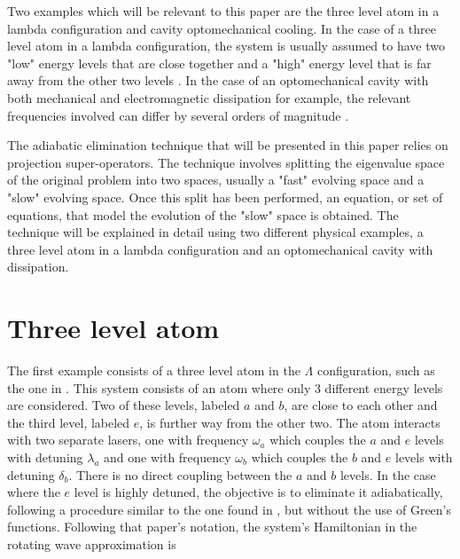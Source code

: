 \documentclass[12pt]{article}
\begin{document}
 Two examples which will be relevant to this paper are the three level atom in a lambda configuration and cavity optomechanical cooling.  In the case of a three level atom in a lambda configuration, the system is usually assumed to have two "low" energy levels that are close together and a "high" energy level that is far away from the other two levels \cite{BrionAdiabatic2006}. In the case of an optomechanical cavity with both mechanical and electromagnetic dissipation for example, the relevant frequencies involved can differ by several orders of magnitude \cite{VezioOMExperiment2020}.

The adiabatic elimination technique that will be presented in this paper relies on projection super-operators. The technique involves splitting the eigenvalue space of the original problem into two spaces, usually a "fast" evolving space and a "slow" evolving space. Once this split has been performed, an equation, or set of equations, that model the evolution of the "slow" space is obtained. The technique will be explained in detail using two different physical examples, a three level atom in a lambda configuration and an optomechanical cavity with dissipation. 
 


\section{Three level atom}\label{sect:ThreeLevelAtom}

The first example consists of a three level atom in the $\Lambda$ configuration, such as the one in \cite{Ying3LevelAtom1996}. This system consists of an atom where only 3 different energy levels are considered. Two of these levels, labeled $a$ and $b$, are close to each other and the third level, labeled $e$, is further way from the other two. The atom interacts with two separate lasers, one with frequency $\omega_a$ which couples the $a$ and $e$ levels with detuning $\lambda_a$ and one with frequency $\omega_b$ which couples the $b$ and $e$ levels with detuning $\delta_b$. There is no direct coupling between the $a$ and $b$ levels. In the case where the $e$ level is highly detuned, the objective is to eliminate it adiabatically, following a procedure similar to the one found in \cite{BrionAdiabatic2006}, but without the use of Green's functions. Following that paper's notation,  the system's Hamiltonian in the rotating wave approximation is
\end{document}
